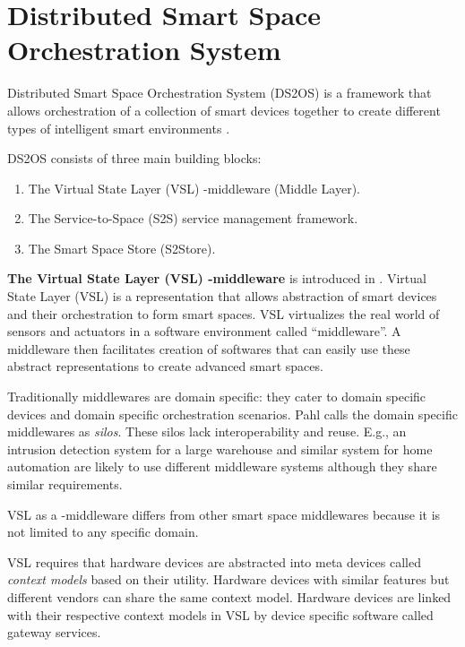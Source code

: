 \section{Distributed Smart Space Orchestration System}
\label{sec:ds2os}

Distributed Smart Space Orchestration System (DS2OS) is a framework that allows orchestration of a collection of smart devices together to create different types of intelligent smart environments \cite{pahl2014distributed}. 

DS2OS consists of three main building blocks:

\begin{enumerate}
  \item The Virtual State Layer (VSL) \si{\micro}-middleware (Middle Layer).
  \item The Service-to-Space (S2S) service management framework.
  \item The Smart Space Store (S2Store).
\end{enumerate}

\textbf{The Virtual State Layer (VSL) \si{\micro}-middleware} is introduced in \cite{pahl2013missing}\cite{pahl2014distributed}. Virtual State Layer (VSL) is a representation that allows abstraction of smart devices and their orchestration to form smart spaces. VSL virtualizes the real world of sensors and actuators in a software environment called ``middleware''. A middleware then facilitates creation of softwares that can easily use these abstract representations to create advanced smart spaces.

Traditionally middlewares are domain specific: they cater to domain specific devices and domain specific orchestration scenarios. Pahl calls the domain specific middlewares as \emph{silos}. These silos lack interoperability and reuse. E.g., an intrusion detection system for a large warehouse and similar system for home automation are likely to use different middleware systems although they share similar requirements.

VSL as a \si{\micro}-middleware differs from other smart space middlewares because it is not limited to any specific domain.

VSL requires that hardware devices are abstracted into meta devices called \emph{context models} based on their utility. Hardware devices with similar features but different vendors can share the same context model. Hardware devices are linked with their respective context models in VSL by device specific software called gateway services.

